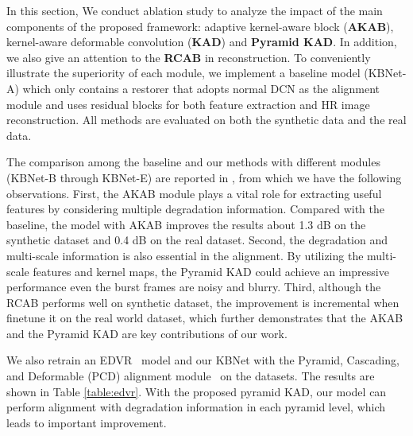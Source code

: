In this section, We conduct ablation study to analyze the impact of the main components of the proposed framework: adaptive kernel-aware block (\textbf{AKAB}), kernel-aware deformable convolution (\textbf{KAD}) and \textbf{Pyramid KAD}. In addition, we also give an attention to the \textbf{RCAB} in reconstruction. To conveniently illustrate the superiority of each module, we implement a baseline model (KBNet-A) which only contains a restorer that adopts normal DCN as the alignment module and uses residual blocks for both feature extraction and HR image reconstruction. All methods are evaluated on both the synthetic data and the real data.

The comparison among the baseline and our methods with different modules (KBNet-B through KBNet-E) are reported in , from which we have the following observations. First, the AKAB module plays a vital role for extracting useful features by considering multiple degradation information. Compared with the baseline, the model with AKAB improves the results about 1.3 dB on the synthetic dataset and 0.4 dB on the real dataset. Second, the degradation and multi-scale information is also essential in the alignment. By utilizing the multi-scale features and kernel maps, the Pyramid KAD could achieve an impressive performance even the burst frames are noisy and blurry. Third, although the RCAB performs well on synthetic dataset, the improvement is incremental when finetune it on the real world dataset, which further demonstrates that the AKAB and the Pyramid KAD are key contributions of our work.

We also retrain an EDVR~\cite{wang2019edvr} model and our KBNet with the Pyramid, Cascading, and Deformable (PCD) alignment module~\cite{wang2019edvr} on the datasets. The results are shown in Table \ref{table:edvr}. With the proposed pyramid KAD, our model can perform alignment with degradation information in each pyramid level, which leads to important improvement.

\begin{table}[ht]
\setlength{\abovecaptionskip}{0.05in}
\setlength{\belowcaptionskip}{-0.1in}
\centering
{}
\caption{Comparison of our method with EDVR.}
\label{table:edvr}
\end{table}


